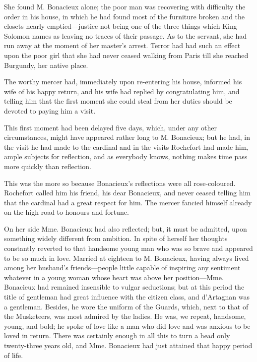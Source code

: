 She found M. Bonacieux alone; the poor man was recovering with difficulty the order in his house, in which he had found most of the furniture broken and the closets nearly emptied---justice not being one of the three things which King Solomon names as leaving no traces of their passage. As to the servant, she had run away at the moment of her master's arrest. Terror had had such an effect upon the poor girl that she had never ceased walking from Paris till she reached Burgundy, her native place. 

The worthy mercer had, immediately upon re-entering his house, informed his wife of his happy return, and his wife had replied by congratulating him, and telling him that the first moment she could steal from her duties should be devoted to paying him a visit. 

This first moment had been delayed five days, which, under any other circumstances, might have appeared rather long to M. Bonacieux; but he had, in the visit he had made to the cardinal and in the visits Rochefort had made him, ample subjects for reflection, and as everybody knows, nothing makes time pass more quickly than reflection. 

This was the more so because Bonacieux's reflections were all rose-coloured. Rochefort called him his friend, his dear Bonacieux, and never ceased telling him that the cardinal had a great respect for him. The mercer fancied himself already on the high road to honours and fortune. 

On her side Mme. Bonacieux had also reflected; but, it must be admitted, upon something widely different from ambition. In spite of herself her thoughts constantly reverted to that handsome young man who was so brave and appeared to be so much in love. Married at eighteen to M. Bonacieux, having always lived among her husband's friends---people little capable of inspiring any sentiment whatever in a young woman whose heart was above her position---Mme. Bonacieux had remained insensible to vulgar seductions; but at this period the title of gentleman had great influence with the citizen class, and d'Artagnan was a gentleman. Besides, he wore the uniform of the Guards, which, next to that of the Musketeers, was most admired by the ladies. He was, we repeat, handsome, young, and bold; he spoke of love like a man who did love and was anxious to be loved in return. There was certainly enough in all this to turn a head only twenty-three years old, and Mme. Bonacieux had just attained that happy period of life. 

